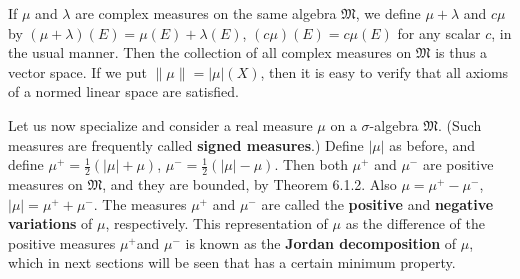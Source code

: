 If $\mu$ and $\lambda$ are complex measures on the same algebra $\mathfrak{M}$, we define $\mu+\lambda$ and $c\mu$ by $(\mu+\lambda)(E)=\mu(E)+\lambda(E)$, $(c\mu)(E)=c\mu(E)$ for any scalar $c$, in the usual manner. Then the collection of all complex measures on $\mathfrak{M}$ is thus a vector space. If we put $\|\mu\|=|\mu|(X)$, then it is easy to verify that all axioms of a normed linear space are satisfied.\par
Let us now specialize and consider a real measure $\mu$ on a $\sigma$-algebra $\mathfrak{M}$. (Such measures are frequently called \textbf{signed measures}.) Define $|\mu|$ as before, and define $\mu^+=\frac{1}{2}(|\mu|+\mu)$, $\mu^-=\frac{1}{2}(|\mu|-\mu)$. Then both $\mu^+$ and $\mu^-$ are positive measures on $\mathfrak{M}$, and they are bounded, by Theorem 6.1.2. Also $\mu=\mu^+-\mu^-$, $|\mu|=\mu^++\mu^-$. The measures $\mu^+$ and $\mu^-$ are called the \textbf{positive} and \textbf{negative variations} of $\mu$, respectively. This representation of $\mu$ as the difference of the positive measures $\mu^+$and $\mu^-$ is known as the \textbf{Jordan decomposition} of $\mu$, which in next sections will be seen that has a certain minimum property.
